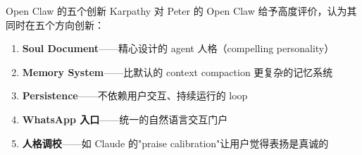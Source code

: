 \begin{knowledgebox}{Open Claw 的五个创新}
Karpathy 对 Peter 的 Open Claw 给予高度评价，认为其同时在五个方向创新：
\begin{enumerate}
    \item \textbf{Soul Document}——精心设计的 agent 人格（compelling personality）
    \item \textbf{Memory System}——比默认的 context compaction 更复杂的记忆系统
    \item \textbf{Persistence}——不依赖用户交互、持续运行的 loop
    \item \textbf{WhatsApp 入口}——统一的自然语言交互门户
    \item \textbf{人格调校}——如 Claude 的"praise calibration"让用户觉得表扬是真诚的
\end{enumerate}
\end{knowledgebox}


